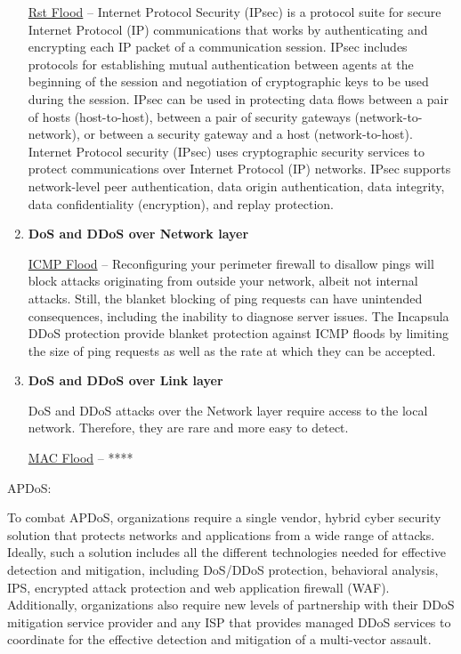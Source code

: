 \documentclass{article}
\begin{document}
\begin{enumerate}
 \hfill \break \underline{Rst Flood} – Internet Protocol Security (IPsec) is a protocol suite for secure Internet Protocol (IP) communications that works by authenticating and encrypting each IP packet of a communication session. IPsec includes protocols for establishing mutual authentication between agents at the beginning of the session and negotiation of cryptographic keys to be used during the session. IPsec can be used in protecting data flows between a pair of hosts (host-to-host), between a pair of security gateways (network-to-network), or between a security gateway and a host (network-to-host). Internet Protocol security (IPsec) uses cryptographic security services to protect communications over Internet Protocol (IP) networks. IPsec supports network-level peer authentication, data origin authentication, data integrity, data confidentiality (encryption), and replay protection.

\item \textbf{DoS and DDoS over Network layer} 

 \hfill \break \underline{ICMP Flood} – Reconfiguring your perimeter firewall to disallow pings will block attacks originating from outside your network, albeit not internal attacks. Still, the blanket blocking of ping requests can have unintended consequences, including the inability to diagnose server issues.
The Incapsula DDoS protection provide blanket protection against ICMP floods by limiting the size of ping requests as well as the rate at which they can be accepted.


\item \textbf{DoS and DDoS over Link layer}  

 \hfill \break DoS and DDoS attacks over the Network layer require access to the local network. Therefore, they are rare and more easy to detect.

 \hfill \break \underline{MAC Flood} – ****


\end{enumerate}

 \hfill \break APDoS:

 \hfill \break To combat APDoS, organizations require a single vendor, hybrid cyber security solution that protects networks and applications from a wide range of attacks. Ideally, such a solution includes all the different technologies needed for effective detection and mitigation, including DoS/DDoS protection, behavioral analysis, IPS, encrypted attack protection and web application firewall (WAF). Additionally, organizations also require new levels of partnership with their DDoS mitigation service provider and any ISP that provides managed DDoS services to coordinate for the effective detection and mitigation of a multi-vector assault.
\end{document}
